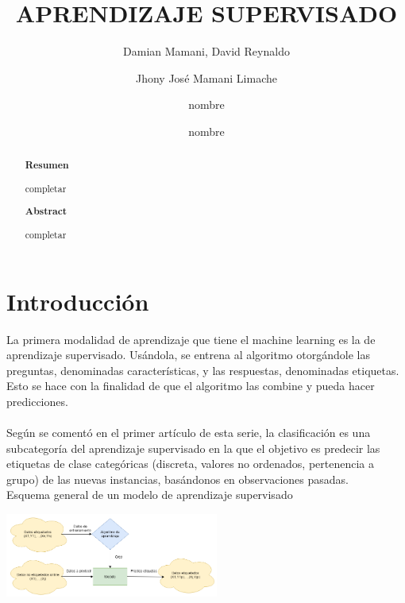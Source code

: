 \documentclass[%
 reprint,
 amsmath,amssymb,
 aps,
]{revtex4-1}
\begin{document}
\title{ APRENDIZAJE SUPERVISADO}
\author{Damian Mamani, David Reynaldo
\and Jhony José Mamani Limache \and nombre  \and nombre }
		
%

\begin{abstract}
\begin{center}
\textbf{Resumen}
\end{center}
completar
\\

\begin{center}
\textbf{Abstract}
\end{center}
completar
\\
\end{abstract}



\maketitle


\section {Introducción}\label{sec:1}
La primera modalidad de aprendizaje que tiene el machine learning es la de aprendizaje supervisado. Usándola, se entrena al algoritmo otorgándole las preguntas, denominadas características, y las respuestas, denominadas etiquetas. Esto se hace con la finalidad de que el algoritmo las combine y pueda hacer predicciones.\\\\
Según se comentó en el primer artículo de esta serie, la clasificación es una subcategoría del aprendizaje supervisado en la que el objetivo es predecir las etiquetas de clase categóricas (discreta, valores no ordenados, pertenencia a grupo) de las nuevas instancias, basándonos en observaciones pasadas.\\
Esquema general de un modelo de aprendizaje supervisado
\begin{center}
\includegraphics[width=7cm]{./Imagenes/esquemageneraldelmodelosupervisado}
\end{center}
 
\end{document}
